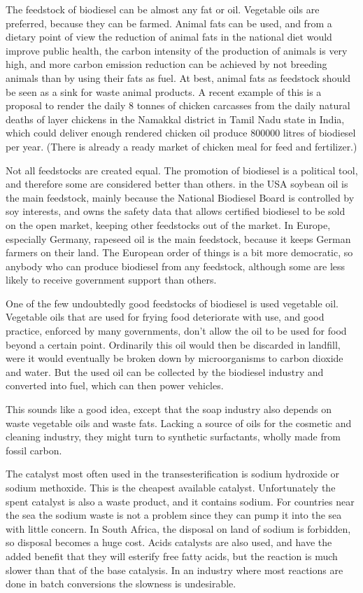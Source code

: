 The feedstock of biodiesel can be almost any fat or oil. Vegetable oils are preferred, because they can be farmed. Animal fats can be used, and from a dietary point of view the reduction of animal fats in the national diet would improve public health, the carbon intensity of the production of animals is very high, and more carbon emission reduction can be achieved by not breeding animals than by using their fats as fuel. At best, animal fats as feedstock should be seen as a sink for waste animal products. A recent example of this is a proposal to render the daily 8 tonnes of chicken carcasses from the daily natural deaths of layer chickens in the Namakkal district in Tamil Nadu state in India, which could deliver enough rendered chicken oil produce 800000 litres of biodiesel per year. (There is already a ready market of chicken meal for feed and fertilizer.) \cite{Abraham2013} \cite{Ananth2013}

Not all feedstocks are created equal. The promotion of biodiesel is a political tool, and therefore some are considered better than others. in the USA soybean oil is the main feedstock, mainly because the National Biodiesel Board is controlled by soy interests, and owns the safety data that allows certified biodiesel to be sold on the open market\cite{Estill2005}, keeping other feedstocks out of the market. In Europe, especially Germany, rapeseed oil is the main feedstock, because it keeps German farmers on their land. The European order of things is a bit more democratic, so anybody who can produce biodiesel from any feedstock, although some are less likely to receive government support than others.

One of the few undoubtedly good feedstocks of biodiesel is used vegetable oil. Vegetable oils that are used for frying food deteriorate with use, and good practice, enforced by many governments, don't allow the oil to be used for food beyond a certain point. Ordinarily this oil would then be discarded in landfill, were it would eventually be broken down by microorganisms to carbon dioxide and water. But the used oil can be collected by the biodiesel industry and converted into fuel, which can then power vehicles. 

This sounds like a good idea, except that the soap industry also depends on waste vegetable oils and waste fats. Lacking a source of oils for the cosmetic and cleaning industry, they might turn to synthetic surfactants, wholly made from fossil carbon.

The catalyst most often used in the transesterification is sodium hydroxide or sodium methoxide. This is the cheapest available catalyst. Unfortunately the spent catalyst is also a waste product, and it contains sodium. For countries near the sea the sodium waste is not a problem since they can pump it into the sea with little concern. In South Africa, the disposal on land of sodium is forbidden, so disposal becomes a huge cost. Acids catalysts are also used, and have the added benefit that they will esterify free fatty acids, but the reaction is much slower than that of the base catalysis. In an industry where most reactions are done in batch conversions the slowness is undesirable.

